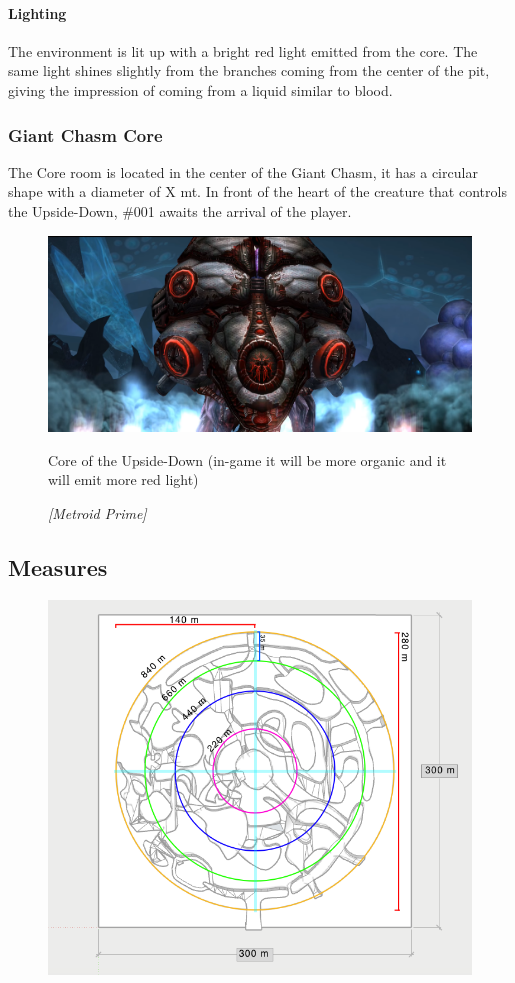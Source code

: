 \paragraph{Lighting}
The environment is lit up with a bright red light emitted from the core. The same light shines slightly from the branches coming from the center of the pit, giving the impression of coming from a liquid similar to blood. 




\newpage
\subsubsection{Giant Chasm Core}
The Core room is located in the center of the Giant Chasm, it has a circular shape with a diameter of X mt. In front of the heart of the creature that controls the Upside-Down, \#001 awaits the arrival of the player.

\vspace*{0.3cm}
\begin{figure}[H]
	\centering
	\includegraphics[width=0.8\linewidth]{images/visual_ref/15_giant_chasm/chasm_core.png}
	\caption*{Core of the Upside-Down (in-game it will be more organic and it will emit more red light)}
	\caption{ \textit{[Metroid Prime]}}
\end{figure}

\newpage
\subsection{Measures}
\begin{figure}[H]
	\centering
	\includegraphics[width=14cm]{images/map/map_measures.png}
\end{figure}

